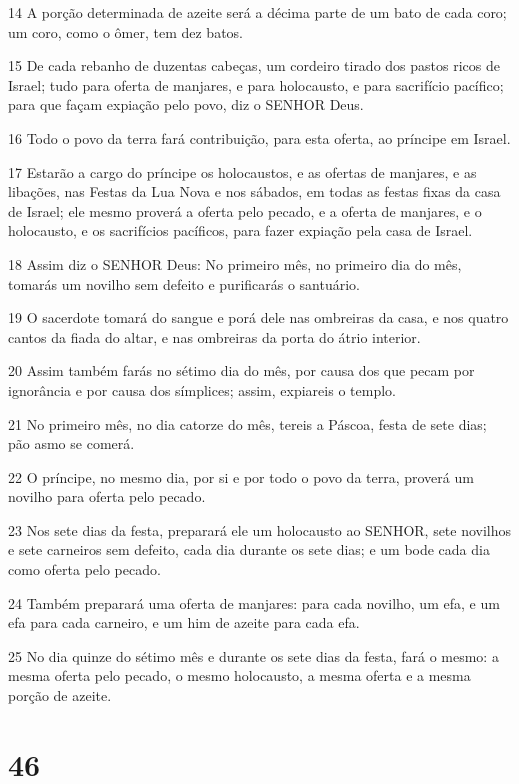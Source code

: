 \par 14 A porção determinada de azeite será a décima parte de um bato de cada coro; um coro, como o ômer, tem dez batos.
\par 15 De cada rebanho de duzentas cabeças, um cordeiro tirado dos pastos ricos de Israel; tudo para oferta de manjares, e para holocausto, e para sacrifício pacífico; para que façam expiação pelo povo, diz o SENHOR Deus.
\par 16 Todo o povo da terra fará contribuição, para esta oferta, ao príncipe em Israel.
\par 17 Estarão a cargo do príncipe os holocaustos, e as ofertas de manjares, e as libações, nas Festas da Lua Nova e nos sábados, em todas as festas fixas da casa de Israel; ele mesmo proverá a oferta pelo pecado, e a oferta de manjares, e o holocausto, e os sacrifícios pacíficos, para fazer expiação pela casa de Israel.
\par 18 Assim diz o SENHOR Deus: No primeiro mês, no primeiro dia do mês, tomarás um novilho sem defeito e purificarás o santuário.
\par 19 O sacerdote tomará do sangue e porá dele nas ombreiras da casa, e nos quatro cantos da fiada do altar, e nas ombreiras da porta do átrio interior.
\par 20 Assim também farás no sétimo dia do mês, por causa dos que pecam por ignorância e por causa dos símplices; assim, expiareis o templo.
\par 21 No primeiro mês, no dia catorze do mês, tereis a Páscoa, festa de sete dias; pão asmo se comerá.
\par 22 O príncipe, no mesmo dia, por si e por todo o povo da terra, proverá um novilho para oferta pelo pecado.
\par 23 Nos sete dias da festa, preparará ele um holocausto ao SENHOR, sete novilhos e sete carneiros sem defeito, cada dia durante os sete dias; e um bode cada dia como oferta pelo pecado.
\par 24 Também preparará uma oferta de manjares: para cada novilho, um efa, e um efa para cada carneiro, e um him de azeite para cada efa.
\par 25 No dia quinze do sétimo mês e durante os sete dias da festa, fará o mesmo: a mesma oferta pelo pecado, o mesmo holocausto, a mesma oferta e a mesma porção de azeite.

\chapter{46}

